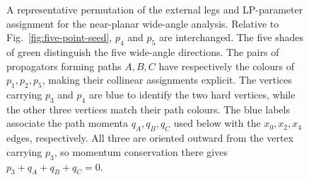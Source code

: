 \documentclass[a4paper,11pt]{article}
\begin{document}
\begin{figure}[H]
\caption{A representative permutation of the external legs and LP-parameter assignment for
the near-planar wide-angle analysis.  Relative to
Fig.~\ref{fig:five-point-seed}, \(p_4\) and \(p_5\) are interchanged.  The
five shades of green distinguish the five wide-angle directions.
The pairs of propagators forming paths \(A,B,C\) have respectively the
colours of \(p_1,p_2,p_5\), making their collinear assignments explicit.
The vertices carrying \(p_3\) and \(p_4\) are blue to identify the two hard
vertices, while the other three vertices match their path colours.
The blue labels associate the path momenta \(q_A,q_B,q_C\) used below with
the \(x_0,x_2,x_4\) edges, respectively.  All three are oriented outward
from the vertex carrying \(p_3\), so momentum conservation there gives
\(p_3+q_A+q_B+q_C=0\).
}
\label{fig:five-point-near-planar-attachment}
\end{figure}
\end{document}
